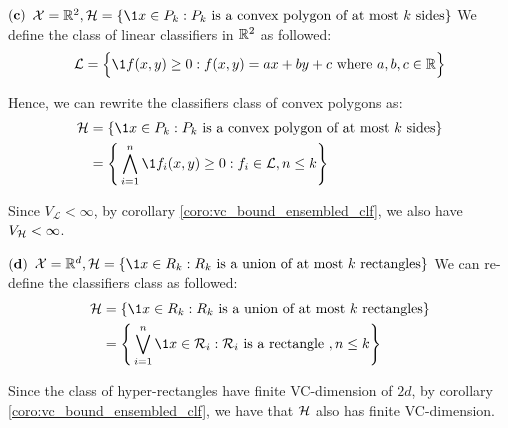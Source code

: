 \begin{solution*}
\begin{subproof}{\newline ${\bf (c)}$ $\X=\R^2, \Hf=\{ \1{x \in P_k} : P_k \text{ is a convex polygon of at most $k$ sides} \}$}
        \noindent We define the class of linear classifiers in $\mathbb{R}^2$ as followed:
        \begin{align*}
            \mathcal{L} = \bigCurl{
                \1{f(x, y) \ge 0} : f(x, y) = ax + by + c \text{ where } a, b, c \in \R
            }
        \end{align*}

        \noindent Hence, we can rewrite the classifiers class of convex polygons as:
        \begin{align*}
            \Hf
                &=\{ \1{x \in P_k} : P_k \text{ is a convex polygon of at most $k$ sides} \} \\
                &= \biggCurl{
                    \bigwedge_{i=1}^n \1{f_i(x, y) \ge 0} : f_i \in \mathcal{L}, n \le k
                }
        \end{align*}

        \noindent Since $V_\mathcal{L}<\infty$, by corollary \ref{coro:vc_bound_ensembled_clf}, we also have $V_{\mathcal{H}}<\infty$.
    \end{subproof}

    \begin{subproof}{\newline ${\bf (d)}$ $\X=\R^d, \Hf=\{ \1{x \in R_k} : R_k \text{ is a union of at most $k$ rectangles} \}$}
        We can re-define the classifiers class as followed:
        \begin{align*}
            \Hf
                &=\{ \1{x \in R_k} : R_k \text{ is a union of at most $k$ rectangles} \} \\
                &=\biggCurl{\bigvee_{i=1}^n \1{x\in \mathcal{R}_i} : \mathcal{R}_i \text{ is a rectangle }, n\le k}
        \end{align*}
    \end{subproof}

    \noindent Since the class of hyper-rectangles have finite VC-dimension of $2d$, by corollary \ref{coro:vc_bound_ensembled_clf}, we have that $\mathcal{H}$ also has finite VC-dimension.
\end{solution*}



